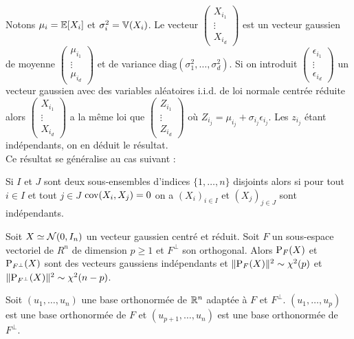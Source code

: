 \Preuve Notons $\mu_i = \mathbb{E}[X_i]$ et $\sigma_i^2 = \mathbb{V}(X_i)$. Le vecteur 
$\begin{pmatrix}
X_{i_1}\\
\vdots \\
X_{i_d}
\end{pmatrix}$ est un vecteur gaussien de moyenne
$\begin{pmatrix}
\mu_{i_1}\\
\vdots \\
\mu_{i_d}
\end{pmatrix}$ et de variance $\text{diag}(\sigma_1^2,\ldots,\sigma_d^2)$. Si on introduit 
$\begin{pmatrix}
\epsilon_{i_1}\\
\vdots \\
\epsilon_{i_d}
\end{pmatrix}$ un vecteur gaussien avec des variables aléatoires i.i.d. de loi normale centrée réduite alors $\begin{pmatrix}
X_{i_1}\\
\vdots \\
X_{i_d}
\end{pmatrix}$ a la même loi que 
$\begin{pmatrix}
Z_{i_1}\\
\vdots \\
Z_{i_d}
\end{pmatrix}$ où $Z_{i_j} = \mu_{i_j} + \sigma_{i_j}\epsilon_{i_j}$. Les $z_{i_j}$ étant indépendants, on en déduit le résultat. \\

Ce résultat se généralise au cas suivant :
\begin{prop}
Si $I$ et $J$ sont deux sous-ensembles d'indices $\{1,\ldots,n\}$ disjoints alors si pour tout $i \in I$ et tout $j \in J$ $\mathrm{cov}(X_i,X_j)=0$ on a $(X_i)_{i \in I}$ et $(X_j)_{j \in J}$ sont indépendants.
\end{prop}

\begin{thm}[Cochran]
  Soit $X \simeq \mathcal{N}(0,I_n)$ un vecteur gaussien centré et réduit. Soit $F$ un sous-espace vectoriel de $R^n$ de dimension $p\geq 1$ et $F^\bot$ son orthogonal. Alors $\mathrm{P}_F(X)$ et $\mathrm{P}_{F^\bot}(X)$ sont des vecteurs gaussiens indépendants et $\Vert \mathrm{P}_{F}(X)\Vert^2 \sim \chi^2(p)$ et $\Vert \mathrm{P}_{F^\bot}(X)\Vert^2 \sim \chi^2(n-p)$.
\end{thm}

\Preuve Soit $(u_1,\ldots,u_n)$ une base orthonormée de $\mathbb{R}^n$ adaptée à $F$ et $F^\bot$. $(u_1,\ldots,u_p)$ est une base orthonormée de $F$ et $(u_{p+1},\ldots,u_n)$ est une base orthonormée de $F^\bot$. \\

